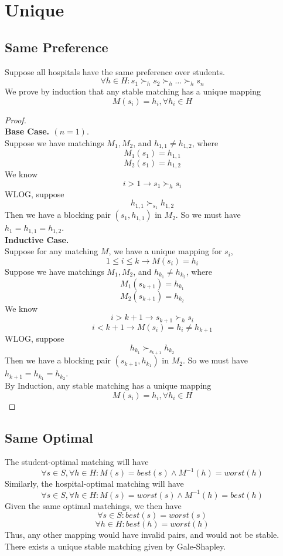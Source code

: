 \newpage
\section{Unique}

\subsection{Same Preference}
Suppose all hospitals have the same preference over students.
\[\forall h \in H: s_1\succ_h s_2 \succ_h \dots \succ_h s_n\]
We prove by induction that any stable matching has a unique mapping
\[M(s_i)=h_i, \forall h_i\in H\]
\begin{proof}
    \\
    \textbf{Base Case. $(n=1)$}.\\
    Suppose we have matchings $M_1,M_2$, and $h_{1,1}\neq h_{1,2}$, where 
    \[M_1(s_1)=h_{1,1}\]
    \[M_2(s_1)=h_{1,2}\]
    We know
    \[ i > 1 \rightarrow s_1\succ_h s_i\]
    WLOG, suppose
    \[h_{1,1} \succ_{s_1} h_{1,2}\]
    Then we have a blocking pair $(s_1,h_{1,1})$ in $M_2$.
    So we must have $h_1=h_{1,1}=h_{1,2}$.\\
    \textbf{Inductive Case.} \\
    Suppose for any matching $M$, we have a unique mapping for $s_i$,
    \[1\leq i \leq k \rightarrow M(s_i)=h_i\]
    Suppose we have matchings $M_1,M_2$, and $h_{k_1}\neq h_{k_2}$, where 
    \[M_1(s_{k+1})=h_{k_1}\]
    \[M_2(s_{k+1})=h_{k_2}\]
    We know 
    \[i > k+1 \rightarrow s_{k+1} \succ_h s_i\]
    \[i < k+1 \rightarrow M(s_i)=h_i\neq h_{k+1}\]
    WLOG, suppose
    \[h_{k_1} \succ_{s_{k+1}} h_{k_2}\]
    Then we have a blocking pair $(s_{k+1},h_{k_1})$ in $M_2$.
    So we must have $h_{k+1}=h_{k_1}= h_{k_2}$.\\
    By Induction, any stable matching has a unique mapping
    \[M(s_i)=h_i, \forall h_i\in H\]
\end{proof}

\subsection{Same Optimal}
The student-optimal matching will have
\[\forall s\in S, \forall h \in H: M(s)=best(s) \wedge M^{-1}(h)=worst(h)\]
Similarly, the hospital-optimal matching will have
\[\forall s\in S, \forall h \in H: M(s)=worst(s) \wedge M^{-1}(h)=best(h)\]
Given the same optimal matchings, we then have
\[\forall s\in S: best(s)=worst(s)\]
\[\forall h\in H: best(h)=worst(h)\]
Thus, any other mapping would have invalid pairs, and would not be stable.
There exists a unique stable matching given by Gale-Shapley.

